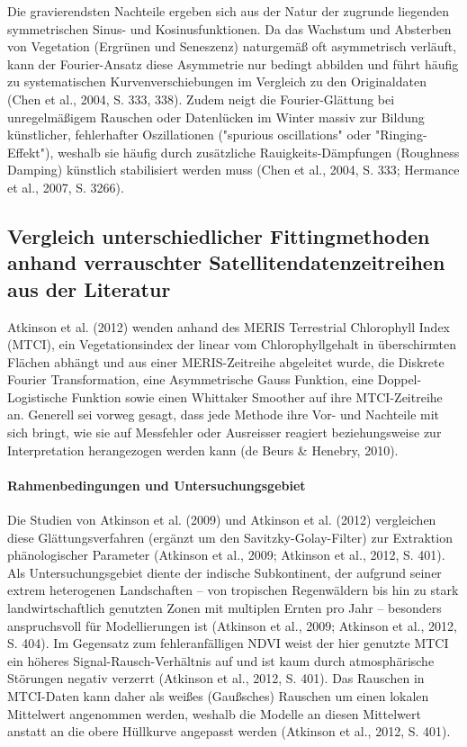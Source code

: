 \documentclass[11pt]{report}
\begin{document}
Die gravierendsten Nachteile ergeben sich aus der Natur der zugrunde liegenden symmetrischen Sinus- und Kosinusfunktionen. Da das Wachstum und Absterben von Vegetation (Ergrünen und Seneszenz) naturgemäß oft asymmetrisch verläuft, kann der Fourier-Ansatz diese Asymmetrie nur bedingt abbilden und führt häufig zu systematischen Kurvenverschiebungen im Vergleich zu den Originaldaten (Chen et al., 2004, S. 333, 338). Zudem neigt die Fourier-Glättung bei unregelmäßigem Rauschen oder Datenlücken im Winter massiv zur Bildung künstlicher, fehlerhafter Oszillationen ("spurious oscillations" oder "Ringing-Effekt"), weshalb sie häufig durch zusätzliche Rauigkeits-Dämpfungen (Roughness Damping) künstlich stabilisiert werden muss (Chen et al., 2004, S. 333; Hermance et al., 2007, S. 3266).



%
\subsection{Vergleich unterschiedlicher Fittingmethoden anhand verrauschter Satellitendatenzeitreihen aus der Literatur}
Atkinson et al. (2012) wenden anhand des MERIS Terrestrial Chlorophyll Index (MTCI), ein Vegetationsindex der linear vom Chlorophyllgehalt in überschirmten Flächen abhängt und aus einer MERIS-Zeitreihe abgeleitet wurde, die Diskrete Fourier Transformation, eine Asymmetrische Gauss Funktion, eine Doppel-Logistische Funktion sowie einen Whittaker Smoother auf ihre MTCI-Zeitreihe an. Generell sei vorweg gesagt, dass jede Methode ihre Vor- und Nachteile mit sich bringt, wie sie auf Messfehler oder Ausreisser reagiert beziehungsweise zur Interpretation herangezogen werden kann (de Beurs \& Henebry, 2010).

\paragraph{Rahmenbedingungen und Untersuchungsgebiet}
Die Studien von Atkinson et al. (2009) und Atkinson et al. (2012) vergleichen diese Glättungsverfahren (ergänzt um den Savitzky-Golay-Filter) zur Extraktion phänologischer Parameter (Atkinson et al., 2009; Atkinson et al., 2012, S. 401). Als Untersuchungsgebiet diente der indische Subkontinent, der aufgrund seiner extrem heterogenen Landschaften – von tropischen Regenwäldern bis hin zu stark landwirtschaftlich genutzten Zonen mit multiplen Ernten pro Jahr – besonders anspruchsvoll für Modellierungen ist (Atkinson et al., 2009; Atkinson et al., 2012, S. 404). Im Gegensatz zum fehleranfälligen NDVI weist der hier genutzte MTCI ein höheres Signal-Rausch-Verhältnis auf und ist kaum durch atmosphärische Störungen negativ verzerrt (Atkinson et al., 2012, S. 401). Das Rauschen in MTCI-Daten kann daher als weißes (Gaußsches) Rauschen um einen lokalen Mittelwert angenommen werden, weshalb die Modelle an diesen Mittelwert anstatt an die obere Hüllkurve angepasst werden (Atkinson et al., 2012, S. 401).
\end{document}

